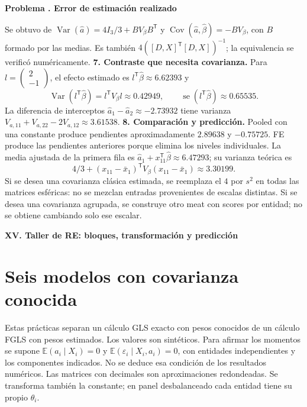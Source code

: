 \documentclass[11pt,a4paper]{article}
\newcommand{\E}{\mathbb E}
\newcommand{\T}{^{\mathsf T}}
\DeclareMathOperator{\Var}{Var}
\DeclareMathOperator{\Cov}{Cov}
\theoremstyle{definition}
\newcommand{\parte}[1]{\par\bigskip\Needspace{8\baselineskip}\begin{center}{\Large\bfseries\color{azul}#1}\end{center}}
\newcounter{problema}
\newenvironment{resuelto}[1]{\refstepcounter{problema}\par\medskip\Needspace{6\baselineskip}\textbf{Problema \theproblema. #1}\par}{\par\medskip}
\DeclareMathOperator{\se}{se}
\newcommand{\eps}{\varepsilon}
\begin{document}
\begin{resuelto}{Error de estimación realizado}
\[\]
Se obtuvo de $\Var(\widehat a)=4I_3/3+BV_\beta B\T$ y $\Cov(\widehat a,\widehat\beta)=-BV_\beta$, con $B$ formado por las medias. Es también $4([D,X]\T[D,X])^{-1}$; la equivalencia se verificó numéricamente.
\textbf{7. Contraste que necesita covarianza.} Para $l=\begin{pmatrix}
2\\-1
\end{pmatrix}$, el efecto estimado es $l\T\widehat\beta\approx6.62393$ y
\[
\Var(l\T\widehat\beta)=l\T V_\beta l\approx0.42949,\qquad \se(l\T\widehat\beta)\approx0.65535.
\]
La diferencia de interceptos $\widehat a_1-\widehat a_2\approx-2.73932$ tiene varianza $V_{a,11}+V_{a,22}-2V_{a,12}\approx3.61538$.
\textbf{8. Comparación y predicción.} Pooled con una constante produce pendientes aproximadamente $2.89638$ y $-0.75725$. FE produce las pendientes anteriores porque elimina los niveles individuales. La media ajustada de la primera fila es $\widehat a_1+x_{11}\T\widehat\beta\approx6.47293$; su varianza teórica es
\[
4/3+(x_{11}-\bar x_1)\T V_\beta(x_{11}-\bar x_1)\approx3.30199.
\]
Si se desea una covarianza clásica estimada, se reemplaza el $4$ por $s^2$ en todas las matrices esféricas: no se mezclan entradas provenientes de escalas distintas. Si se desea una covarianza agrupada, se construye otro meat con scores por entidad; no se obtiene cambiando solo ese escalar.
\end{resuelto}


\parte{XV. Taller de RE: bloques, transformación y predicción}
\section{Seis modelos con covarianza conocida}
Estas prácticas separan un cálculo GLS exacto con pesos conocidos de un cálculo FGLS con pesos estimados. Los valores son sintéticos. Para afirmar los momentos se supone $\E(a_i\mid X_i)=0$ y $\E(\eps_i\mid X_i,a_i)=0$, con entidades independientes y los componentes indicados. No se deduce esa condición de los resultados numéricos. Las matrices con decimales son aproximaciones redondeadas. Se transforma también la constante; en panel desbalanceado cada entidad tiene su propio $\theta_i$.
\end{document}
